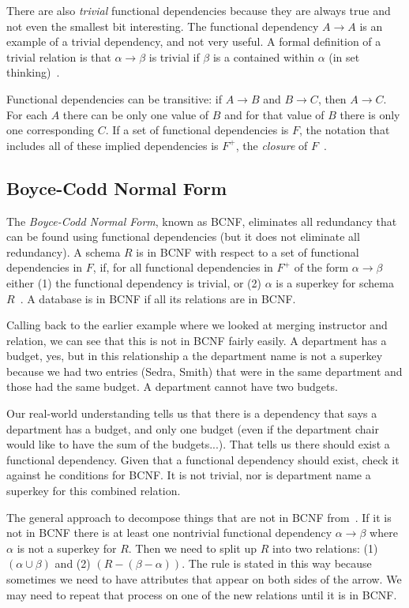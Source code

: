 There are also \textit{trivial} functional dependencies because they are always true and not even the smallest bit interesting. The functional dependency $A \rightarrow A$ is an example of a trivial dependency, and not very useful. A formal definition of a trivial relation is that $\alpha \rightarrow \beta$ is trivial if $\beta$ is a contained within $\alpha$ (in set thinking)~\cite{dsc}.

Functional dependencies can be transitive: if $A \rightarrow B$ and $B \rightarrow C$, then $A \rightarrow C$. For each $A$ there can be only one value of $B$ and for that value of $B$ there is only one corresponding $C$. If a set of functional dependencies is $F$, the notation that includes all of these implied dependencies is $F^{+}$, the \textit{closure} of $F$~\cite{dsc}.

\subsection*{Boyce-Codd Normal Form}

The \textit{Boyce-Codd Normal Form}, known as BCNF, eliminates all redundancy that can be found using functional dependencies (but it does not eliminate all redundancy). A schema $R$ is in BCNF with respect to a set of functional dependencies in $F$, if, for all functional dependencies in $F^{+}$ of the form $\alpha \rightarrow \beta$ either (1) the functional dependency is trivial, or (2) $\alpha$ is a superkey for schema $R$~\cite{dsc}. A database is in BCNF if all its relations are in BCNF.

Calling back to the earlier example where we looked at merging instructor and relation, we can see that this is not in BCNF fairly easily. A department has a budget, yes, but in this relationship a the department name is not a superkey because we had two entries (Sedra, Smith) that were in the same department and those had the same budget. A department cannot have two budgets.

Our real-world understanding tells us that there is a dependency that says a department has a budget, and only one budget (even if the department chair would like to have the sum of the budgets...). That tells us there should exist a functional dependency. Given that a functional dependency should exist, check it against he conditions for BCNF. It is not trivial, nor is department name a superkey for this combined relation.

The general approach to decompose things that are not in BCNF from~\cite{dsc}. If it is not in BCNF there is at least one nontrivial functional dependency $\alpha \rightarrow \beta$ where $\alpha$ is not a superkey for $R$. Then we need to split up $R$ into two relations: (1) $(\alpha \cup \beta)$ and (2) $(R - (\beta - \alpha))$. The rule is stated in this way because sometimes we need to have attributes that appear on both sides of the arrow. We may need to repeat that process on one of the new relations until it is in BCNF.

